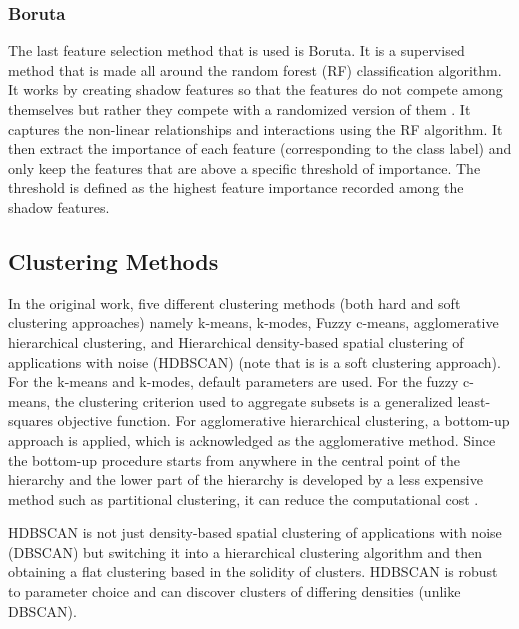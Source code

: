 \documentclass[%
 aip,
 jmp,%
 amsmath,amssymb,
 reprint,%
]{revtex4-2}
\begin{document}
\subsubsection{Boruta}
The last feature selection method that is used is Boruta. It is a supervised method that is made all around the
random forest (RF) classification algorithm. It works by creating shadow features so that the features do not compete
among themselves but rather they compete with a randomized version of them \cite{ref48}. It captures the non-linear
relationships and interactions using the RF algorithm. It then extract the importance of each feature (corresponding
to the class label) and only keep the features that are above a specific threshold of importance. The threshold is
defined as the highest feature importance recorded among the shadow features.

\subsection{Clustering Methods}
In the original work, five different clustering methods (both hard and soft clustering approaches) namely k-means\cite{ref49}, k-modes\cite{ref50}, Fuzzy
c-means\cite{ref51,ref52}, agglomerative hierarchical clustering, and Hierarchical density-based spatial clustering of applications with noise (HDBSCAN)\cite{ref53,ref54}
(note that is is a soft clustering approach). For the k-means and k-modes, default parameters are used. For the fuzzy c-means, the clustering criterion used to aggregate
subsets is a generalized least-squares objective function. For agglomerative hierarchical clustering, a bottom-up approach is applied, which is acknowledged as the
agglomerative method. Since the bottom-up procedure starts from anywhere in the central point of the hierarchy and the lower part of the hierarchy is developed by a
less expensive method such as partitional clustering, it can reduce the computational cost \cite{ref55}.

HDBSCAN is not just density-based spatial clustering of applications with noise (DBSCAN) but switching it into a hierarchical clustering algorithm and then obtaining
a flat clustering based in the solidity of clusters. HDBSCAN is robust to parameter choice and can discover clusters of differing densities (unlike DBSCAN)\cite{ref54}.
\end{document}
